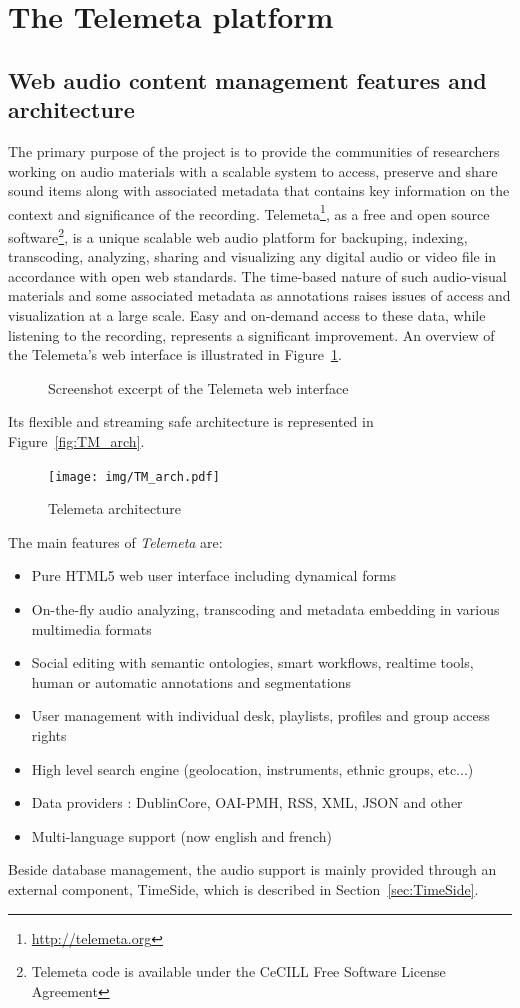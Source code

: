 \documentclass{sig-alternate}
\begin{document}
 
 \section{The Telemeta platform}\label{sec:Telemeta}
 \subsection{Web audio content management features and architecture}
The primary purpose of the project is to provide the communities of researchers working on audio materials with a scalable system to access, preserve and share sound items along with associated metadata that contains key information on the context and significance of the recording.
Telemeta\footnote{\url{http://telemeta.org}}, as a free and open source software\footnote{Telemeta code is available under the CeCILL Free Software License Agreement}, is a unique scalable web audio platform for backuping, indexing, transcoding, analyzing, sharing and visualizing any digital audio or video file in accordance with open web standards.
The time-based nature of such audio-visual materials and some associated metadata as annotations raises issues of access and visualization at a large scale. Easy and on-demand access to these data, while listening to the recording, represents a significant improvement.
An overview of the Telemeta's web interface is illustrated in Figure~\ref{fig:Telemeta}.
\begin{figure}[htb]
   \centering
   \caption[1]{Screenshot excerpt of the Telemeta web interface}
    \label{fig:Telemeta}
 \end{figure}
Its flexible and streaming safe architecture is represented in Figure~\ref{fig:TM_arch}.
\begin{figure}[htb]
  \centering
  \texttt{[image: img/TM\_arch.pdf]}
  \caption{Telemeta architecture}\label{fig:TM_arch}
  \label{fig:screenshot}
\end{figure}
The main features of \emph{Telemeta} are:
      \begin{itemize}
      \item Pure HTML5 web user interface including dynamical forms
      \item On-the-fly audio analyzing, transcoding and metadata
        embedding in various multimedia formats
      \item Social editing with semantic ontologies, smart workflows,
        realtime tools, human or automatic annotations and
        segmentations
      \item User management with individual desk, playlists, profiles
        and group access rights
      \item High level search engine (geolocation, instruments, ethnic groups, etc...)
      \item Data providers : DublinCore, OAI-PMH, RSS, XML, JSON and other 
      \item Multi-language support (now english and french)
      \end{itemize}
Beside database management, the audio support is mainly provided through an external component, TimeSide, which is described in Section~\ref{sec:TimeSide}.
\end{document}
